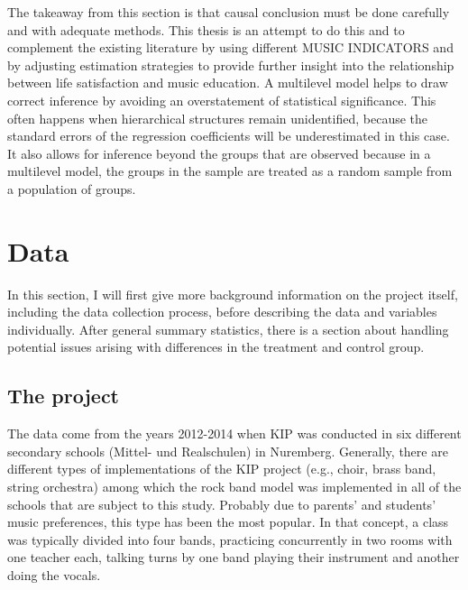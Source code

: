 \documentclass[a4, 12pt]{article}
\begin{document}
The takeaway from this section is that causal conclusion must be done carefully and with adequate methods. This thesis is an attempt to do this and to complement the existing literature by using different MUSIC INDICATORS and by adjusting estimation strategies to provide further insight into the relationship between life satisfaction and music education. A multilevel model helps to draw correct inference by avoiding an overstatement of statistical significance. This often happens when hierarchical structures remain unidentified, because the standard errors of the regression coefficients will be underestimated in this case. It also allows for inference beyond the groups that are observed because in a multilevel model, the groups in the sample are treated as a random sample from a population of groups.

\clearpage

\hypertarget{data}{%
\section{Data}\label{data}}

\label{ch:data}
In this section, I will first give more background information on the project itself, including the data collection process, before describing the data and variables individually. After general summary statistics, there is a section about handling potential issues arising with differences in the treatment and control group.

\hypertarget{the-project}{%
\subsection{The project}\label{the-project}}

\label{sec:project}
The data come from the years 2012-2014 when KIP was conducted in six different secondary schools (Mittel- und Realschulen) in Nuremberg. Generally, there are different types of implementations of the KIP project (e.g., choir, brass band, string orchestra) among which the rock band model was implemented in all of the schools that are subject to this study. Probably due to parents' and students' music preferences, this type has been the most popular. In that concept, a class was typically divided into four bands, practicing concurrently in two rooms with one teacher each, talking turns by one band playing their instrument and another doing the vocals.
\end{document}
